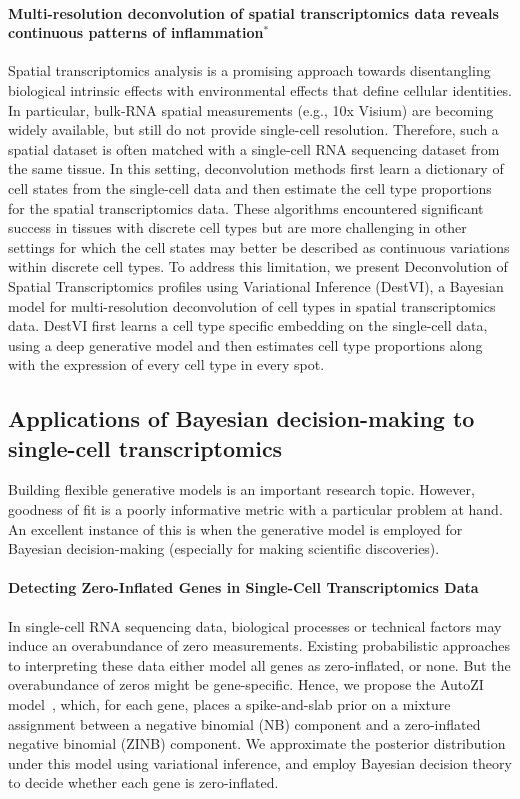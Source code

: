 \paragraph{Multi-resolution deconvolution of spatial transcriptomics data reveals continuous patterns of inflammation$^*$}
Spatial transcriptomics analysis is a promising approach towards disentangling biological intrinsic effects with environmental effects that define cellular identities. In particular, bulk-RNA spatial measurements (e.g., 10x Visium) are becoming widely available, but still do not provide single-cell resolution. Therefore, such a spatial dataset is often matched with a single-cell RNA sequencing dataset from the same tissue. In this setting, deconvolution methods first learn a dictionary of cell states from the single-cell data and then estimate the cell type proportions for the spatial transcriptomics data. These algorithms encountered significant success in tissues with discrete cell types but are more challenging in other settings for which the cell states may better be described as continuous variations within discrete cell types. To address this limitation, we present Deconvolution of Spatial Transcriptomics profiles using Variational Inference (DestVI), a Bayesian model for multi-resolution deconvolution of cell types in spatial transcriptomics data. DestVI first learns a cell type specific embedding on the single-cell data, using a deep generative model and then estimates cell type proportions along with the expression of every cell type in every spot. 


\subsection{Applications of Bayesian decision-making to single-cell transcriptomics}
Building flexible generative models is an important research topic. However, goodness of fit is a poorly informative metric with a particular problem at hand. An excellent instance of this is when the generative model is employed for Bayesian decision-making (especially for making scientific discoveries). 

\paragraph{Detecting Zero-Inflated Genes in Single-Cell Transcriptomics Data}
In single-cell RNA sequencing data, biological processes or technical factors may induce an overabundance of zero measurements. Existing probabilistic approaches to interpreting these data either model all genes as zero-inflated, or none. But the overabundance of zeros might be gene-specific. Hence, we propose the AutoZI model~\cite{clivio.detecting}, which, for each gene, places a spike-and-slab prior on a mixture assignment between a negative binomial (NB) component and a zero-inflated negative binomial (ZINB) component. We approximate the posterior distribution under this model using variational inference, and employ Bayesian decision theory to decide whether each gene is zero-inflated. 

